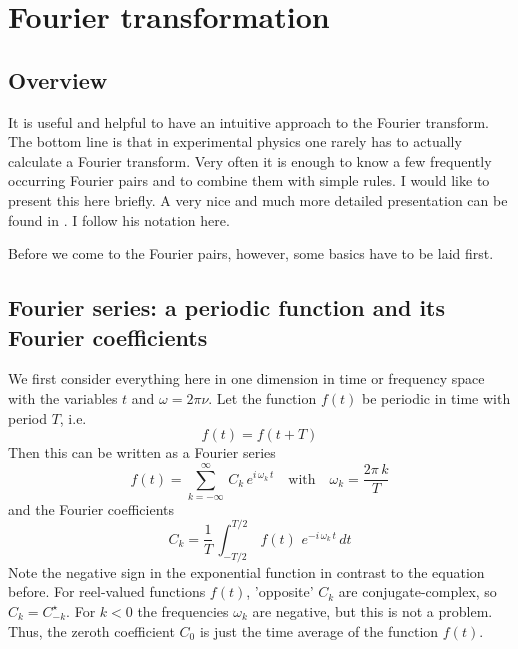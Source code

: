 \renewcommand{\lastmod}{May 20, 2020}
\renewcommand{\chapterauthors}{Markus Lippitz}

\chapter{Fourier transformation}



\section{Overview}

It is useful and helpful to have an intuitive approach to the Fourier transform. The bottom line is that in experimental physics one rarely has to actually calculate a Fourier transform. Very often it is enough to know a few frequently occurring Fourier pairs and to combine them with simple rules. I would like to present this here briefly. A very nice and much more detailed presentation can be found in \cite{Butz2015}. I follow his notation here.

Before we come to the Fourier pairs, however, some basics have to be laid first.

\section{Fourier series: a periodic function and its Fourier coefficients}

We first consider everything here in one dimension in time or frequency space with the variables $t$ and $\omega = 2 \pi \nu$. Let the function $f(t)$ be periodic in time with period $T$, i.e. 
\begin{equation}
 f(t) = f (t + T)
\end{equation}
Then this can be written as a Fourier series
\begin{equation}
 f(t) = \sum_{k=-\infty}^{\infty} \, C_k \, e^{i \, \omega_k \, t}
 \quad \text{with} \quad \omega_k = \frac{2 \pi \, k}{T}
\end{equation}
and the Fourier coefficients
\begin{equation}
 C_k = \frac{1}{T} \, \int_{-T/2}^{T/2} \, f(t) \, \, e^{-i \, \omega_k \, t} \, dt
\end{equation}
Note the negative sign in the exponential function in contrast to the equation before. For reel-valued functions $f(t)$, 'opposite' $C_k$ are conjugate-complex, so $C_k = C_{-k}^\star$. For $k<0$ the frequencies $\omega_k$ are negative, but this is not a problem. Thus, the zeroth coefficient $C_0$ is just the time average of the function $f(t)$.



